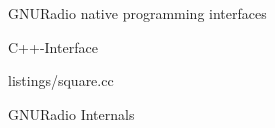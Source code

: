 \begin{subchapter}{GNURadio native programming interfaces}
  \begin{subsubchapter}{C++-Interface}
    \begin{minipage}{\linewidth}
      
                      {listings/square.cc}
    \end{minipage}
  \end{subsubchapter}
\end{subchapter}


\begin{subchapter}{GNURadio Internals}
\end{subchapter}
